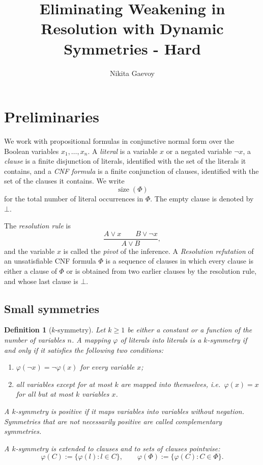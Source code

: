 \documentclass[10pt]{article}
\title{Eliminating Weakening in Resolution with Dynamic Symmetries - Hard}
\author{Nikita Gaevoy}
\date{}
\newtheorem{definition}{Definition}
\begin{document}
\maketitle

\section{Preliminaries}

We work with propositional formulas in conjunctive normal form over the
Boolean variables $x_1,\ldots,x_n$. A \emph{literal} is a variable $x$ or a
negated variable $\lnot x$, a \emph{clause} is a finite disjunction of
literals, identified with the set of the literals it contains, and a
\emph{CNF formula} is a finite conjunction of clauses, identified with the
set of the clauses it contains. We write
\[
\operatorname{size}(\Phi)
\]
for the total number of literal occurrences in $\Phi$. The empty clause is
denoted by $\bot$.

The \emph{resolution rule} is
\[
\frac{
A\lor x
\qquad
B\lor\lnot x
}{
A\lor B
},
\]
and the variable $x$ is called the \emph{pivot} of the inference. A
\emph{Resolution refutation} of an unsatisfiable CNF formula $\Phi$ is a
sequence of clauses in which every clause is either a clause of $\Phi$ or is
obtained from two earlier clauses by the resolution rule, and whose last
clause is $\bot$.

\subsection{Small symmetries}

\begin{definition}[$k$-symmetry]\label{def:ksym}
Let $k\ge 1$ be either a constant or a function of the number of variables
$n$. A mapping $\varphi$ of literals into literals is a \emph{$k$-symmetry} if
and only if it satisfies the following two conditions:
\begin{enumerate}
    \item $\varphi(\lnot x)=\lnot\varphi(x)$ for every variable $x$;
    \item all variables except for at most $k$ are mapped into themselves,
    i.e.\ $\varphi(x)=x$ for all but at most $k$ variables $x$.
\end{enumerate}
A $k$-symmetry is \emph{positive} if it maps variables into variables without
negation. Symmetries that are not necessarily positive are called
\emph{complementary} symmetries.

A $k$-symmetry is extended to clauses and to sets of clauses pointwise:
\[
\varphi(C):=\{\varphi(l):l\in C\},
\qquad
\varphi(\Phi):=\{\varphi(C):C\in\Phi\}.
\]
\end{definition}
\end{document}
